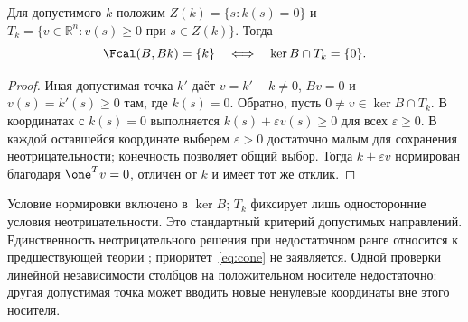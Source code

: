 \begin{theorem}
\label{thm:cone}
{Для допустимого $k$ положим $Z(k)=\{s:k(s)=0\}$ и $T_k=\{v\in\mathbb R^n:v(s)\geq0\text{ при }s\in Z(k)\}$. Тогда}
\begin{equation}\label{eq:cone}
 \Fcal(B,Bk)=\{k\}\quad\Longleftrightarrow\quad
 \ker B\cap T_k=\{0\}.
\end{equation}
\end{theorem}
\begin{proof}
{Иная допустимая точка $k'$ даёт $v=k'-k\ne0$, $Bv=0$ и $v(s)=k'(s)\geq0$ там, где $k(s)=0$. Обратно, пусть $0\ne v\in\ker B\cap T_k$. В координатах с $k(s)=0$ выполняется $k(s)+\varepsilon v(s)\geq0$ для всех $\varepsilon\geq0$. В каждой оставшейся координате выберем $\varepsilon>0$ достаточно малым для сохранения неотрицательности; конечность позволяет общий выбор. Тогда $k+\varepsilon v$ нормирован благодаря $\one^Tv=0$, отличен от $k$ и имеет тот же отклик.}
\end{proof}

{Условие нормировки включено в $\ker B$; $T_k$ фиксирует лишь односторонние условия неотрицательности. Это стандартный критерий допустимых направлений. Единственность неотрицательного решения при недостаточном ранге относится к предшествующей теории \cite{DonohoTanner}; приоритет~\eqref{eq:cone} не заявляется. Одной проверки линейной независимости столбцов на положительном носителе недостаточно: другая допустимая точка может вводить новые ненулевые координаты вне этого носителя.}

